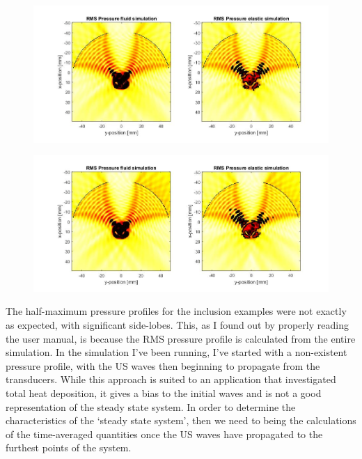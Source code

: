 \documentclass[10pt,a4paper]{article}
\begin{document}
\begin{figure}[H]\label{comp_290kHz}
\hspace*{-4cm}                                                    
\includegraphics[scale=0.6]{comp_290kHz}
\end{figure}
\begin{figure}[H]\label{comp_300kHz}
\hspace*{-4cm}                                                    
\includegraphics[scale=0.6]{comp_300kHz}
\end{figure}


The half-maximum pressure profiles for the inclusion examples were not exactly as expected, with significant side-lobes. This, as I found out by properly reading the user manual, is because the RMS pressure profile is calculated from the entire simulation. In the simulation I've been running, I've started with a non-existent pressure profile, with the US waves then beginning to propagate from the transducers. While this approach is suited to an application that investigated total heat deposition, it gives a bias to the initial waves and is not a good representation of the steady state system. In order to determine the characteristics of the `steady state system', then we need to being the calculations of the time-averaged quantities once the US waves have propagated to the furthest points of the system. 
\end{document}
